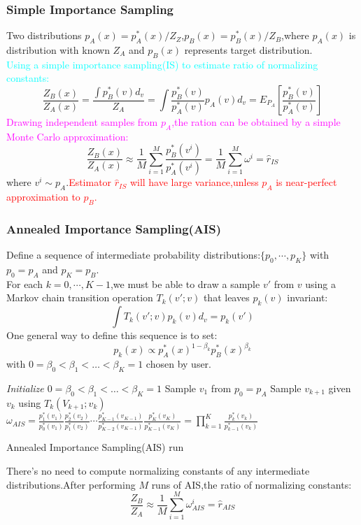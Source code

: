 \documentclass{beamer}
\begin{document}
\begin{CJK*}{UTF8}{gbsn}
\begin{frame}\frametitle{Simple Importance Sampling}
Two distributions $p_A(x)=p_A^\ast(x)/Z_Z$,$p_B(x)=p_B^\ast(x)/Z_B$,where $p_A(x)$ is distribution with known $Z_A$ and $p_B(x)$ represents target distribution.\\
\textcolor{cyan}{Using a simple importance sampling(IS) to estimate ratio of normalizing constants:}
\begin{equation}
\frac{Z_B(x)}{Z_A(x)}=\frac{\int p_B^\ast(v)d_v}{Z_A}=\int\frac{p_B^\ast(v)}{p_A^\ast(v)}p_A(v)d_v=E_{P_A}\left[\frac{p_B^\ast(v)}{p_A^\ast(v)}\right]
\end{equation}
\textcolor{magenta}{Drawing independent samples from $p_A$,the ration can be obtained by a simple Monte Carlo approximation:}
\begin{equation}
\frac{Z_B(x)}{Z_A(x)}\approx\frac{1}{M}\sum_{i=1}^M\frac{p_B^\ast(v^i)}{p_A^\ast(v^i)}=\frac{1}{M}\sum_{i=1}^M\omega^i=\hat{r}_{IS}
\end{equation}
where $v^i\sim p_A$.\textcolor{red}{Estimator $\hat{r}_{IS}$ will have large variance,unless $p_A$ is near-perfect approximation to $p_B$.}
\end{frame}

\begin{frame}[allowframebreaks]\frametitle{Annealed Importance Sampling(AIS)}
Define a sequence of intermediate probability distributions:$\{p_0,\cdots,p_K\}$ with $p_0=p_A$ and $p_K=p_B$.\\
For each $k=0,\cdots,K-1$,we must be able to draw a sample $v'$ from $v$ using a Markov chain transition operation $T_k(v';v)$ that leaves $p_k(v)$ invariant:
\begin{equation}
\int T_k(v';v)p_k(v)d_v=p_k(v')
\end{equation}
One general way to define this sequence is to set:
\begin{equation}
p_k(x)\propto p_A^\ast(x)^{1-\beta_k}p_B^\ast(x)^{\beta_k}
\end{equation}
with $0=\beta_0<\beta_1<\dots<\beta_K=1$ chosen by user.

\begin{algorithm}[H]
\emph{Initialize $0=\beta_0<\beta_1<\dots<\beta_K=1$}\;
\;
Sample $v_1$ from $p_0=p_A$\;
{
	Sample $v_{k+1}$ given $v_k$ using $T_k(V_{k+1};v_k)$\;
}
\Return $\omega_{AIS}=\frac{p_1^\ast(v_1)}{p_{0}^\ast(v_1)}\frac{p_2^\ast(v_2)}{p_{1}^\ast(v_2)}\cdots\frac{p_{K-1}^\ast(v_{K-1})}{p_{K-2}^\ast(v_{K-1})}\frac{p_K^\ast(v_K)}{p_{K-1}^\ast(v_K)}=\prod_{k=1}^K\frac{p_k^\ast(v_k)}{p_{k-1}^\ast(v_k)}$\;	
\caption{Annealed Importance Sampling(AIS) run}
\end{algorithm}
There's no need to compute normalizing constants of any intermediate distributions.After performing $M$ runs of AIS,the ratio of normalizing constants:
\begin{equation}
\frac{Z_B}{Z_A}\approx\frac{1}{M}\sum_{i=1}^M\omega_{AIS}^i=\hat{r}_{AIS}
\end{equation}
\end{frame}


\end{CJK*}
\end{document}
